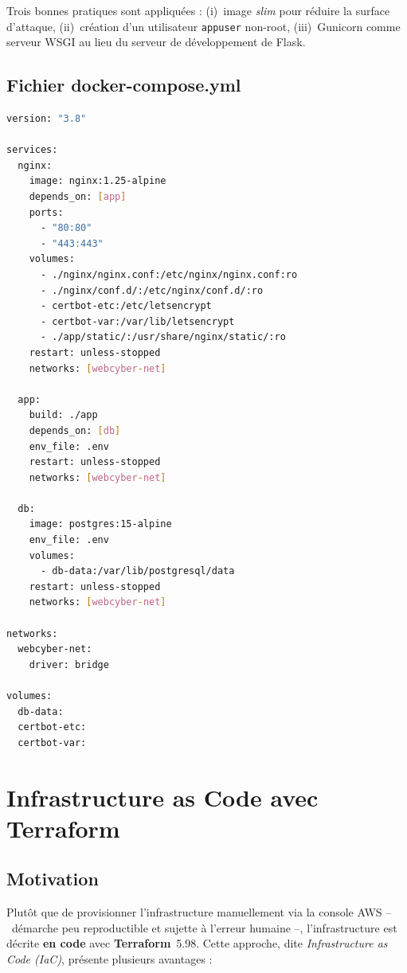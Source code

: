 Trois bonnes pratiques sont appliquées : (i)~image \emph{slim} pour
réduire la surface d'attaque, (ii)~création d'un utilisateur
\texttt{appuser} non-root, (iii)~Gunicorn comme serveur WSGI au lieu
du serveur de développement de Flask.

\subsection{Fichier docker-compose.yml}

\begin{lstlisting}[language=bash, caption={\texttt{docker-compose.yml} --- vue conceptuelle.}]
version: "3.8"

services:
  nginx:
    image: nginx:1.25-alpine
    depends_on: [app]
    ports:
      - "80:80"
      - "443:443"
    volumes:
      - ./nginx/nginx.conf:/etc/nginx/nginx.conf:ro
      - ./nginx/conf.d/:/etc/nginx/conf.d/:ro
      - certbot-etc:/etc/letsencrypt
      - certbot-var:/var/lib/letsencrypt
      - ./app/static/:/usr/share/nginx/static/:ro
    restart: unless-stopped
    networks: [webcyber-net]

  app:
    build: ./app
    depends_on: [db]
    env_file: .env
    restart: unless-stopped
    networks: [webcyber-net]

  db:
    image: postgres:15-alpine
    env_file: .env
    volumes:
      - db-data:/var/lib/postgresql/data
    restart: unless-stopped
    networks: [webcyber-net]

networks:
  webcyber-net:
    driver: bridge

volumes:
  db-data:
  certbot-etc:
  certbot-var:
\end{lstlisting}

\section{Infrastructure as Code avec Terraform}

\subsection{Motivation}

Plutôt que de provisionner l'infrastructure manuellement via la console
AWS \---\ démarche peu reproductible et sujette à l'erreur humaine \---,
l'infrastructure est décrite \textbf{en code} avec
\textbf{Terraform}~5.98. Cette approche, dite \emph{Infrastructure as
Code (IaC)}, présente plusieurs avantages :

